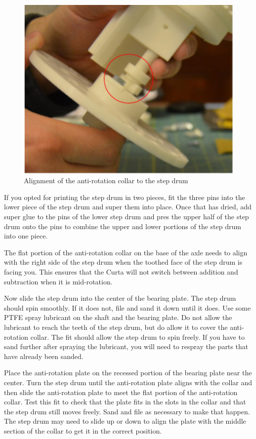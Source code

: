 \documentclass{article}
\begin{document}
\begin{figure}
 \centering
 \includegraphics[width=.4\textwidth]{images/anti-rotation-collar.png}
 \caption{Alignment of the anti-rotation collar to the step drum}
\end{figure}

If you opted for printing the step drum in two pieces, fit the three pins into the lower piece of 
the step drum and super them into place. Once that has dried, add super glue to the pins of the lower
step drum and pres the upper half of the step drum onto the pins to combine the upper and lower
portions of the step drum into one piece.




The flat portion of the anti-rotation collar on the base of the axle needs to align with the right
side of the step drum when the toothed face of the step drum is facing you. This ensures that
the Curta will not switch between addition and subtraction when it is mid-rotation.



Now slide the step drum into the center of the bearing plate. The step drum should spin smoothly.
If it does not, file and sand it down until it does. Use some PTFE spray lubricant on the shaft and
the bearing plate. Do not allow the lubricant to reach the teeth of the step drum, but do allow it
to cover the anti-rotation collar. The fit should allow the step drum to spin freely. If you have to
sand further after spraying the lubricant, you will need to respray the parts that have already been
sanded.

Place the anti-rotation plate on the recessed portion of the bearing plate near the center. Turn the
step drum until the anti-rotation plate aligns with the collar and then slide the anti-rotation
plate to meet the flat portion of the anti-rotation collar. Test this fit to check that the plate
fits in the slots in the collar and that the step drum still moves freely. Sand and file as necessary
to make that happen. The step drum may need to slide up or down to align the plate with the middle 
section of the collar to get it in the correct position.
\end{document}
